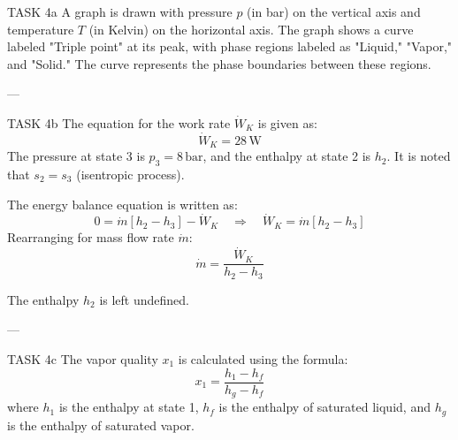 TASK 4a  
A graph is drawn with pressure \( p \) (in bar) on the vertical axis and temperature \( T \) (in Kelvin) on the horizontal axis. The graph shows a curve labeled "Triple point" at its peak, with phase regions labeled as "Liquid," "Vapor," and "Solid." The curve represents the phase boundaries between these regions.

---

TASK 4b  
The equation for the work rate \( \dot{W}_K \) is given as:  
\[
\dot{W}_K = 28 \, \text{W}
\]  
The pressure at state 3 is \( p_3 = 8 \, \text{bar} \), and the enthalpy at state 2 is \( h_2 \). It is noted that \( s_2 = s_3 \) (isentropic process).  

The energy balance equation is written as:  
\[
0 = \dot{m} [h_2 - h_3] - \dot{W}_K \quad \Rightarrow \quad \dot{W}_K = \dot{m} [h_2 - h_3]
\]  
Rearranging for mass flow rate \( \dot{m} \):  
\[
\dot{m} = \frac{\dot{W}_K}{h_2 - h_3}
\]  

The enthalpy \( h_2 \) is left undefined.

---

TASK 4c  
The vapor quality \( x_1 \) is calculated using the formula:  
\[
x_1 = \frac{h_1 - h_f}{h_g - h_f}
\]  
where \( h_1 \) is the enthalpy at state 1, \( h_f \) is the enthalpy of saturated liquid, and \( h_g \) is the enthalpy of saturated vapor.